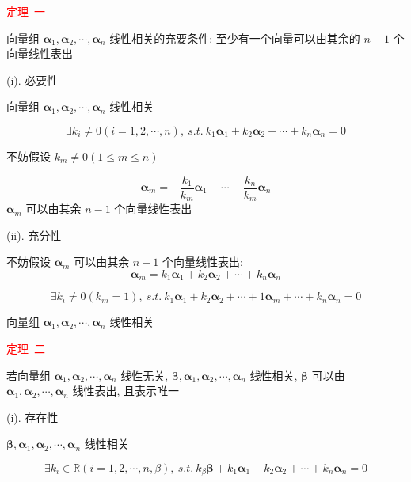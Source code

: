 \begin{theorem}[判别线性相关性的七大定理]
	\textcolor{red}{定理\ 一}
	
	 向量组 $\boldsymbol{\alpha}_{1}, \boldsymbol{\alpha}_{2}, \cdots, \boldsymbol{\alpha}_{n}$ 线性相关的充要条件: 至少有一个向量可以由其余的 $n-1$ 个向量线性表出
	 
	 \begin{anymark}[证明]
	 	(i). 必要性
	 	
	 	向量组 $\boldsymbol{\alpha}_{1}, \boldsymbol{\alpha}_{2}, \cdots, \boldsymbol{\alpha}_{n}$ 线性相关
	 	
		$$\exists k_{i}\neq 0(i=1,2,\cdots,n),\ s.t.\ k_{1}\boldsymbol{\alpha}_{1} + k_{2}\boldsymbol{\alpha}_{2} + \cdots + k_{n}\boldsymbol{\alpha}_{n}=0$$
	 	
		不妨假设 $k_{m}\neq 0(1\leq m\leq n)$

	 	$$\boldsymbol{\alpha}_{m} = -\dfrac{k_{1}}{k_{m}}\boldsymbol{\alpha}_{1}-\cdots-\dfrac{k_{n}}{k_{m}}\boldsymbol{\alpha}_{n}$$
	 	$\boldsymbol{\alpha}_{m}$ 可以由其余 $n-1$ 个向量线性表出
	 	
	 	(ii). 充分性
	 	
	 	不妨假设 $\boldsymbol{\alpha}_{m}$ 可以由其余 $n-1$ 个向量线性表出:  
	 	$$\boldsymbol{\alpha}_{m} = k_{1}\boldsymbol{\alpha}_{1} + k_{2}\boldsymbol{\alpha}_{2} + \cdots + k_{n}\boldsymbol{\alpha}_{n}$$
	 	
		$$\exists k_{i}\neq 0(k_{m} = 1),\ s.t. \ k_{1}\boldsymbol{\alpha}_{1} + k_{2}\boldsymbol{\alpha}_{2} + \cdots + 1\boldsymbol{\alpha}_{m} + \cdots + k_{n}\boldsymbol{\alpha}_{n}=0$$
	 	
		向量组 $\boldsymbol{\alpha}_{1}, \boldsymbol{\alpha}_{2}, \cdots, \boldsymbol{\alpha}_{n}$ 线性相关
	 \end{anymark}

	\textcolor{red}{定理\ 二}
	
	若向量组 $\boldsymbol{\alpha}_{1}, \boldsymbol{\alpha}_{2}, \cdots, \boldsymbol{\alpha}_{n}$ 线性无关, $\boldsymbol{\beta}, \boldsymbol{\alpha}_{1}, \boldsymbol{\alpha}_{2}, \cdots, \boldsymbol{\alpha}_{n}$ 线性相关, 
	$\boldsymbol{\beta}$ 可以由 $\boldsymbol{\alpha}_{1}, \boldsymbol{\alpha}_{2}, \cdots, \boldsymbol{\alpha}_{n}$ 线性表出, 且表示唯一
	\begin{anymark}[证明]
		(i). 存在性
		
		$\boldsymbol{\beta}, \boldsymbol{\alpha}_{1}, \boldsymbol{\alpha}_{2}, \cdots, \boldsymbol{\alpha}_{n}$ 线性相关

		$$\exists k_{i}\in\mathbb{R}(i = 1,2,\cdots,n,\beta),\ s.t. \ k_{\beta}\boldsymbol{\beta} + k_{1}\boldsymbol{\alpha}_{1} + k_{2}\boldsymbol{\alpha}_{2} + \cdots + k_{n}\boldsymbol{\alpha}_{n} = 0$$


\end{anymark}
\end{theorem}
